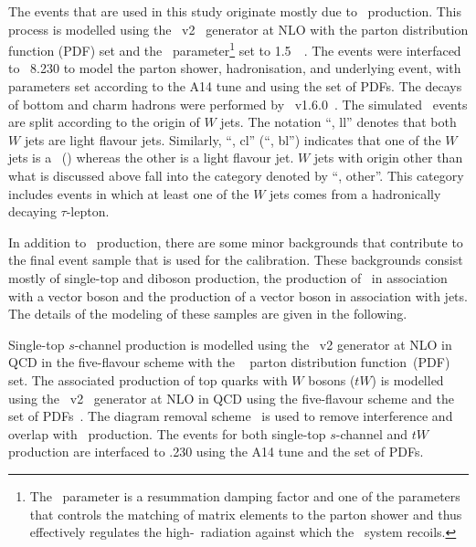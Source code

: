 \documentclass[letterpaper,12pt]{article}
\begin{document}
The events that are used in this study originate mostly due to 
\ttbar\ production. This process is modelled using the
\powhegbox~v2~\cite{Frixione:2007nw,Nason:2004rx,Frixione:2007vw,Alioli:2010xd}
generator at NLO with the \nnpdfnlo %
parton distribution function (PDF) set
and the \hdamp\ parameter\footnote{The
  \hdamp\ parameter is a resummation damping factor and one of the
  parameters that controls the matching of \powheg matrix elements to
  the parton shower and thus effectively regulates the
  high-\pt\ radiation against which the \ttbar\ system recoils.} set
to 1.5~\mtop~\cite{ATL-PHYS-PUB-2016-020}.  The events were interfaced
to {\PYTHIA}~8.230 to model the parton shower,
hadronisation, and underlying event, with parameters set according
to the A14 tune and using the \nnpdftwo set of PDFs.
The decays of bottom and charm hadrons were performed by \evtgen~v1.6.0~\cite{EvtGen}.
 The simulated \ttbar\
events are split according to the origin of $W$ jets. The notation
``\ttbar, ll'' denotes that both $W$ jets are light flavour jets.
Similarly, ``\ttbar, cl'' (``\ttbar, bl'') 
indicates that one of the $W$ jets is a \cjet\ (\bjet)
whereas the other is a light flavour jet. $W$ jets with origin
other than what is discussed above fall into the 
category denoted by ``\ttbar, other''. This category includes
events in which at least one of the $W$ jets comes from a
hadronically decaying $\tau$-lepton. 

In addition to \ttbar\ production, there are some minor backgrounds
that contribute to the final event sample that is used for the calibration.
These backgrounds consist mostly of single-top and diboson production, 
the production of \ttbar\ in association with a vector boson
and the production of a vector boson in association with jets.
The details
of the modeling of these samples are given in the following.

Single-top $s$-channel production is modelled using the \powhegbox~v2 %
generator at NLO in QCD in the five-flavour scheme with the \nnpdfnlo~\cite{Ball:2014uwa} parton distribution function~(PDF) set.
%
The associated production of top quarks with $W$ bosons ($tW$) is
modelled using the
\powhegbox~v2~\cite{Re:2010bp,Nason:2004rx,Frixione:2007vw,Alioli:2010xd}
generator at NLO in QCD using the five-flavour scheme and the
\nnpdfnlo set of PDFs~\cite{Ball:2014uwa}.
The diagram removal scheme~\cite{Frixione:2008yi} is used to
remove interference and overlap with \ttbar\ production. 
The events for both single-top $s$-channel and $tW$ production 
are interfaced to \pythia.230%
using the A14 tune%
and the \nnpdftwo set of PDFs. %
\end{document}
